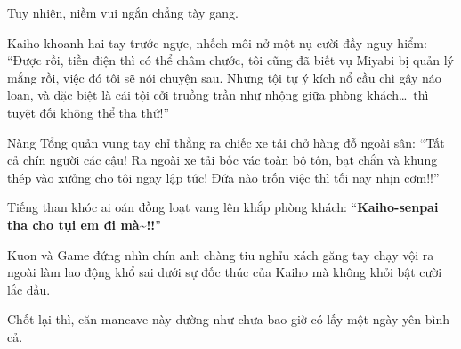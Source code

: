 \documentclass[../main.tex]{subfiles}
\begin{document}
Tuy nhiên, niềm vui ngắn chẳng tày gang.

Kaiho khoanh hai tay trước ngực, nhếch môi nở một nụ cười đầy nguy hiểm: ``Được rồi, tiền điện thì có thể châm chước, tôi cũng đã biết vụ Miyabi bị quản lý mắng rồi, việc đó tôi sẽ nói chuyện sau. Nhưng tội tự ý kích nổ cầu chì gây náo loạn, và đặc biệt là cái tội cởi truồng trần như nhộng giữa phòng khách\dots\ thì tuyệt đối không thể tha thứ!''

Nàng Tổng quản vung tay chỉ thẳng ra chiếc xe tải chở hàng đỗ ngoài sân: ``Tất cả chín người các cậu! Ra ngoài xe tải bốc vác toàn bộ tôn, bạt chắn và khung thép vào xưởng cho tôi ngay lập tức! Đứa nào trốn việc thì tối nay nhịn cơm!!''

Tiếng than khóc ai oán đồng loạt vang lên khắp phòng khách: ``\textbf{Kaiho-senpai tha cho tụi em đi mà\~{}!!}''

Kuon và Game đứng nhìn chín anh chàng tiu nghỉu xách găng tay chạy vội ra ngoài làm lao động khổ sai dưới sự đốc thúc của Kaiho mà không khỏi bật cười lắc đầu.

Chốt lại thì, căn mancave này dường như chưa bao giờ có lấy một ngày yên bình cả.
\end{document}
